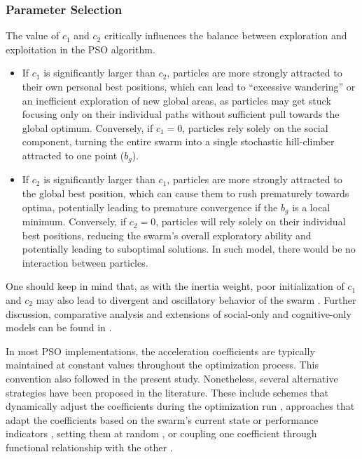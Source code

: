 {\subsubsection{Parameter Selection}\label{subsubsec:param_select}

The value of $c_1$ and $c_2$ critically influences the balance between exploration and exploitation in the PSO algorithm.
\begin{itemize}
    \item If $c_1$ is significantly larger than $c_2$, particles are more strongly attracted to their own personal best positions, which can lead to ``excessive wandering'' or an inefficient exploration of new global areas, as particles may get stuck focusing only on their individual paths without sufficient pull towards the global optimum.
    Conversely, if $c_1 = 0$, particles rely solely on the social component, turning the entire swarm into a single stochastic hill-climber attracted to one point ($b_g$).
    \item If $c_2$ is significantly larger than $c_1$, particles are more strongly attracted to the global best position, which can cause them to rush prematurely towards optima, potentially leading to premature convergence if the $b_g$ is a local minimum.
    Conversely, if $c_2 = 0$, particles will rely solely on their individual best positions, reducing the swarm's overall exploratory ability and potentially leading to suboptimal solutions. In such model, there would be no interaction between particles.
\end{itemize}
One should keep in mind that, as with the inertia weight, poor initialization of $c_1$ and $c_2$ may also lead to divergent and oscillatory behavior of the swarm \citep[][]{engelbrecht2007computational}. Further discussion, comparative analysis and extensions of social-only and cognitive-only models can be found in \citep[][]{kennedy1997particle,brits2002niching,liu2019hierarchical,chen2025multi}.

In most PSO implementations, the acceleration coefficients are typically maintained at constant values throughout the optimization process. This convention also followed in the present study. Nonetheless, several alternative strategies  have been proposed in the literature.
These include schemes that dynamically adjust the coefficients during the optimization run \citep[e.g.,][]{ratnaweera2002pso,watanabe2024nonlinear,tian2024improved}, approaches that adapt the coefficients based on the swarm's current state or performance indicators \citep[e.g.,][]{zhan2007adaptive,wang2011selfadaptive,wang2018hybrid,bonthagorla2025fast},
setting them at random \citep[e.g.,][]{krohling2004gaussian},
or coupling one coefficient through functional relationship with the other \citep[e.g.,][]{cleghorn2022particle,yin2023reinforcement}.

}
